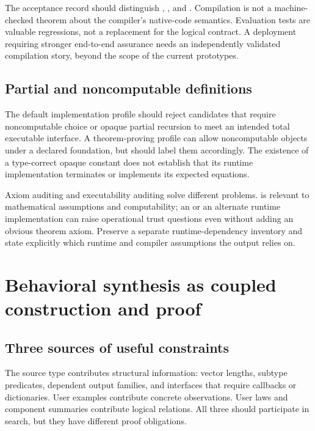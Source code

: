 The acceptance record should distinguish , , and . Compilation is not a machine-checked theorem about the compiler's native-code semantics. Evaluation tests are valuable regressions, not a replacement for the logical contract. A deployment requiring stronger end-to-end assurance needs an independently validated compilation story, beyond the scope of the current prototypes.

\subsection{Partial and noncomputable definitions}

The default implementation profile should reject candidates that require noncomputable choice or opaque partial recursion to meet an intended total executable interface. A theorem-proving profile can allow noncomputable objects under a declared foundation, but should label them accordingly. The existence of a type-correct opaque constant does not establish that its runtime implementation terminates or implements its expected equations.

Axiom auditing and executability auditing solve different problems.  is relevant to mathematical assumptions and computability; an  or an alternate runtime implementation can raise operational trust questions even without adding an obvious theorem axiom. Preserve a separate runtime-dependency inventory and state explicitly which runtime and compiler assumptions the output relies on.

\section{Behavioral synthesis as coupled construction and proof}
\label{sec:behavior}

\subsection{Three sources of useful constraints}

The source type contributes structural information: vector lengths, subtype predicates, dependent output families, and interfaces that require callbacks or dictionaries. User examples contribute concrete observations. User laws and component summaries contribute logical relations. All three should participate in search, but they have different proof obligations.

